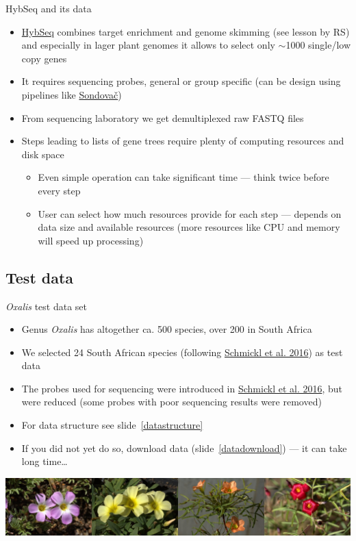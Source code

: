 \documentclass[compress, ucs, xelatex, 11pt, xcolor=x11names, aspectratio=169,
	hyperref={
		bookmarks=true,
		unicode=true,
		colorlinks=true,
		pdftitle={HybSeq course},
		plainpages=false,
		pdfauthor={Vojtech Zeisek},
		pdfsubject={Practical processing of HybSeq target enrichment sequencing data on computing grids like MetaCentrum},
		pdfcreator={XeLaTeX},
		pdfkeywords={BASH, command line, GNU, HybSeq, Linux, MetaCentrum, sequencing shell, target enrichment},
		linkcolor=Cyan2, %
		anchorcolor=Firebrick2, %
		citecolor=Firebrick2, %
		filecolor=Firebrick2, %
		menucolor=Firebrick2, %
		urlcolor=Chartreuse2, %
		pdftex},
	url={hyphens, lowtilde} %
	]{beamer}
\begin{document}
\begin{frame}{HybSeq and its data}
	\begin{itemize}
		\item \href{https://bsapubs.onlinelibrary.wiley.com/doi/full/10.3732/apps.1400042}{HybSeq} combines target enrichment and genome skimming (see lesson by RS) and especially in lager plant genomes it allows to select only $\sim$1000 single/low copy genes
		\item It requires sequencing probes, general or group specific (can be design using pipelines like \href{https://github.com/V-Z/sondovac/wiki}{Sondovač})
		\item From sequencing laboratory we get demultiplexed raw FASTQ files
		\item Steps leading to lists of gene trees require plenty of computing resources and disk space
		\begin{itemize}
			\item Even simple operation can take significant time --- think twice before every step
			\item User can select how much resources provide for each step --- depends on data size and available resources (more resources like CPU and memory will speed up processing)
		\end{itemize}
	\end{itemize}
\end{frame}

\subsection{Test data}

\begin{frame}{\textit{Oxalis} test data set}
	\begin{itemize}
		\item Genus \textit{Oxalis} has altogether ca. 500 species, over 200 in South Africa
		\item We selected 24 South African species (following \href{https://onlinelibrary.wiley.com/doi/full/10.1111/1755-0998.12487}{Schmickl et al. 2016}) as test data
		\item The probes used for sequencing were introduced in \href{https://onlinelibrary.wiley.com/doi/full/10.1111/1755-0998.12487}{Schmickl et al. 2016}, but were reduced (some probes with poor sequencing results were removed)
		\item For data structure see slide~\ref{datastructure}
		\item If you did not yet do so, download data (slide~\ref{datadownload}) --- it can take long time\ldots
	\end{itemize}
	\vfill
	\includegraphics[width=\textwidth]{oxalis.jpg}
\end{frame}
\end{document}
